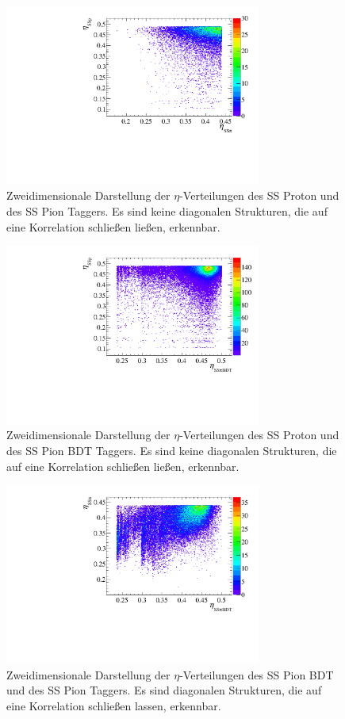\begin{figure}[htbp]
	\centering
		\includegraphics[width=0.75\textwidth]{fig/SSp_SSpi.pdf}
	\caption{Zweidimensionale Darstellung der $\eta$-Verteilungen des SS Proton und des SS Pion Taggers. Es sind keine diagonalen Strukturen, die auf eine Korrelation schließen ließen, erkennbar.}
	\label{fig:SSp_SSpi} 
\end{figure}
\begin{figure}[htbp]
	\centering
		\includegraphics[width=0.75\textwidth]{fig/SSp_SSpiBDT.pdf}
	\caption{Zweidimensionale Darstellung der $\eta$-Verteilungen des SS Proton und des SS Pion BDT Taggers. Es sind keine diagonalen Strukturen, die auf eine Korrelation schließen ließen, erkennbar.}
	\label{fig:SSp_SSpiBDT} 
\end{figure}
\begin{figure}[htbp]
	\centering
		\includegraphics[width=0.75\textwidth]{fig/SSpi_SSpiBDT.pdf}
	\caption{Zweidimensionale Darstellung der $\eta$-Verteilungen des SS Pion BDT und des SS Pion Taggers. Es sind diagonalen Strukturen, die auf eine Korrelation schließen lassen, erkennbar.}
	\label{fig:SSpi_SSpiBDT} 
\end{figure}
